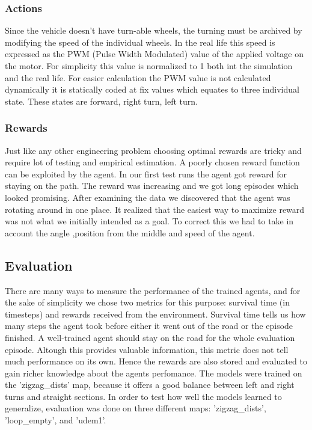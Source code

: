 \documentclass{article}
\begin{document}
\subsubsection{\normalsize{Actions}}
\label{sec:actions}
Since the vehicle doesn't have turn-able wheels, the turning must be archived by modifying the speed of the individual wheels. In the real life this speed is expressed as the PWM (Pulse Width Modulated) value of the applied voltage on the motor. For simplicity this value is normalized to 1 both int the simulation and the real life. For easier calculation the PWM value is not calculated dynamically it is statically coded at fix values which equates to three individual state. These states are forward, right turn, left turn.

\subsubsection{\normalsize{Rewards}}
\label{sec:rewards}
Just like any other engineering problem choosing optimal rewards are tricky and require lot of testing and empirical estimation. A poorly chosen reward function can be exploited by the agent. In our first test runs the agent got reward for staying on the path. The reward was increasing and we got long episodes which looked promising. After examining the data we discovered that the agent was rotating around in one place. It realized that the easiest way to maximize reward was not what we initially intended as a goal. To correct this we had to take in account the angle ,position from the middle and speed of the agent.

\subsection{\normalsize{Evaluation}}
There are many ways to measure the performance of the trained agents, and for the sake of simplicity we chose two metrics for this purpose: survival time (in timesteps) and rewards received from the environment. Survival time tells us how many steps the agent took before either it went out of the road or the episode finished. A well-trained agent should stay on the road for the whole evaluation episode. Altough this provides valuable information, this metric does not tell much performance on its own. Hence the rewards are also stored and evaluated to gain richer knowledge about the agents perfomance. The models were trained on the 'zigzag\_dists' map, because it offers a good balance between left and right turns and straight sections. In order to test how well the models learned to generalize, evaluation was done on three different maps: 'zigzag\_dists', 'loop\_empty', and 'udem1'.
\end{document}
